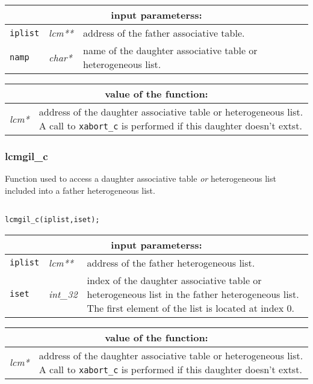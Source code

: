 \vskip 0.5cm

\noindent
\begin{tabular}{|p{1.5cm}|p{2cm}|p{11cm}|}
\hline
\multicolumn{3}{|c|}{\bf input parameterss:} \\
\hline
{\tt iplist} & {\it lcm**} & address of the father associative table. \\
\hline
{\tt namp} & {\it char*} & name of the daughter associative table or heterogeneous list. \\
\hline
\end{tabular}

\vskip 0.4cm

\noindent
\begin{tabular}{|p{4.0cm}|p{11cm}|}
\hline
\multicolumn{2}{|c|}{\bf value of the function:} \\
\hline
{\it lcm*} & address of the daughter associative table or heterogeneous list.  A call to {\tt xabort\_c} is performed if this daughter doesn't extst. \\
\hline
\end{tabular}

\subsubsection{lcmgil\_c}

Function used to access a daughter associative table {\sl or} heterogeneous list included into a father heterogeneous list. 

\begin{verbatim}

lcmgil_c(iplist,iset);
\end{verbatim}

\noindent
\begin{tabular}{|p{1.5cm}|p{2cm}|p{11cm}|}
\hline
\multicolumn{3}{|c|}{\bf input parameterss:} \\
\hline
{\tt iplist} & {\it lcm**} & address of the father heterogeneous list. \\
\hline
{\tt iset} & {\it int\_32} & index of the daughter associative table or heterogeneous list in the father heterogeneous list.
The first element of the list is located at index $0$.  \\
\hline
\end{tabular}

\vskip 0.4cm

\noindent
\begin{tabular}{|p{4.0cm}|p{11cm}|}
\hline
\multicolumn{2}{|c|}{\bf value of the function:} \\
\hline
{\it lcm*} & address of the daughter associative table or heterogeneous list. A call to {\tt xabort\_c} is performed if this daughter doesn't extst. \\
\hline
\end{tabular}

